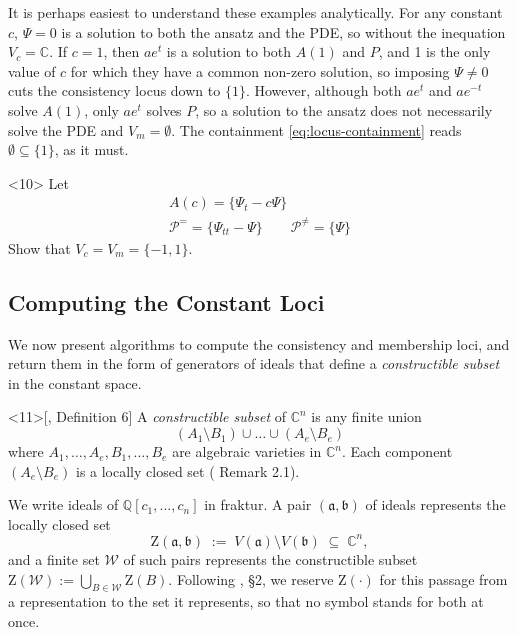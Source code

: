 \documentclass{article}
\theoremstyle{definition}
\theoremstyle{plain}
\begin{document}
It is perhaps easiest to understand these examples analytically.
For any constant $c$, $\Psi=0$ is a solution to both the ansatz and the PDE, so without the inequation $V_c = \mathbb{C}$.
If $c=1$, then $ae^t$ is a solution to both $A(1)$ and $P$, and 1 is the only value of $c$ for which they have a common non-zero solution,
so imposing $\Psi \ne 0$ cuts the consistency locus down to $\{ 1 \}$.
However, although both $ae^t$ and $ae^{-t}$ solve $A(1)$, only $ae^t$ solves $P$,
so a solution to the ansatz does not necessarily solve the PDE and $V_m = \emptyset$.
The containment \eqref{eq:locus-containment} reads
$\emptyset \subseteq \{1\}$, as it must.

\begin{exercise}<10>
Let
\begin{equation}
\begin{gathered}
A(c) = \{ \Psi_{t} - c \Psi \} \\
\mathcal{P}^= = \{ \Psi_{tt} - \Psi \} \qquad \mathcal{P}^{\ne} = \{\Psi\}
\end{gathered}
\end{equation}
Show that $V_c = V_m = \{ -1, 1 \}$.
\end{exercise}

\vfill\eject

\subsection{Computing the Constant Loci}
\label{sec:computing-constant-loci}

We now present algorithms to compute the consistency and membership loci,
and return them in the form of generators of ideals that define a {\it constructible subset}
in the constant space.

\begin{definition}<11>[\cite{CTD}, Definition 6]
A {\it constructible subset} of $\mathbb{C}^n$ is any finite union
\[
(A_1 \setminus B_1 ) \cup \ldots \cup (A_e \setminus B_e )
\]
where $A_1, \ldots , A_e , B_1 , \ldots , B_e$ are algebraic varieties in $\mathbb{C}^n$.
Each component $(A_e \setminus B_e)$ is a locally closed set (\cite{BrunatMontes} Remark 2.1).
\end{definition}


We write ideals of $\mathbb{Q}[c_1, \ldots, c_n]$ in fraktur.
A pair $(\mathfrak{a}, \mathfrak{b})$ of ideals represents the locally closed set
%
\[
\mathrm{Z}(\mathfrak{a}, \mathfrak{b}) \;:=\; V(\mathfrak{a}) \setminus V(\mathfrak{b}) \;\subseteq\; \mathbb{C}^n,
\]
%
and a finite set $\mathcal{W}$ of such pairs represents the constructible subset
$\mathrm{Z}(\mathcal{W}) := \bigcup_{B \in \mathcal{W}} \mathrm{Z}(B)$.  Following \cite{CTD}, \S2, we
reserve $\mathrm{Z}(\cdot)$ for this passage from a representation to the set
it represents, so that no symbol stands for both at once.
\end{document}

